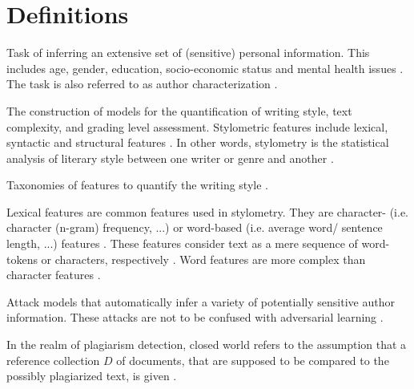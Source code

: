 \section{Definitions}
\label{sec:definitions}


\begin{definition}
    Task of inferring an extensive set of (sensitive) personal information.
    This includes age, gender, education, socio-economic status and mental health issues \cite{emmery_adversarial_2021,stamatatos_survey_2009}.
    The task is also referred to as author characterization \cite{stamatatos_survey_2009}.
\end{definition}

\begin{definition}
    [Stylometry]
    The construction of models for the quantification of writing style, text complexity, and grading level assessment.
    Stylometric features include lexical, syntactic and structural features \cite{stein_intrinsic_2011}.
    In other words, stylometry is the statistical analysis of literary style between one writer or genre and another \cite{tyo_state_2022}.
\end{definition}

\begin{definition}
    Taxonomies of features to quantify the writing style \cite{stamatatos_survey_2009}.
\end{definition}

\begin{definition}
    Lexical features are common features used in stylometry.
    They are character- (i.e. character (n-gram) frequency, ...) 
    or word-based (i.e. average word/ sentence length, ...) features \cite{stein_intrinsic_2011}. 
    These features consider text as a mere sequence of word-tokens or characters, respectively \cite{stamatatos_survey_2009}.
    Word features are more complex than character features \cite{stamatatos_survey_2009}.
\end{definition}

\begin{definition}
    Attack models that automatically infer a variety of potentially sensitive author information.
    These attacks are not to be confused with adversarial learning \cite{emmery_adversarial_2021}.
\end{definition}

\begin{definition}
    In the realm of plagiarism detection, closed world refers to the assumption that a reference collection $D$ of documents, that are supposed to be compared to the possibly plagiarized text, is given \cite{stein_intrinsic_2011}.
\end{definition}

